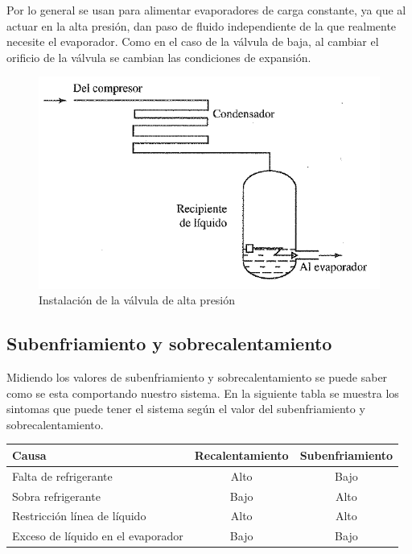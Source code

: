 Por lo general se usan para alimentar evaporadores de carga constante, ya que al actuar en la alta presi\'on, dan paso de fluido independiente de la que realmente necesite el evaporador. Como en el caso de la v\'alvula de baja, al cambiar el orificio de la v\'alvula se cambian las condiciones de expansi\'on.

\begin{figure}[H]
    \centering
    \includegraphics[width=.6\linewidth]{figuras/dispositivos-de-expansion/valvula-expansion-flotador-alta.png}
    \caption{Instalaci\'on de la v\'alvula de alta presi\'on}
    \label{valvula-flotador-alta-presion}
\end{figure}

\subsection{Subenfriamiento y sobrecalentamiento}

Midiendo los valores de subenfriamiento y sobrecalentamiento se puede saber como se esta comportando nuestro sistema. En la siguiente tabla se muestra los sintomas que puede tener el sistema seg\'un el valor del subenfriamiento y sobrecalentamiento.
\begin{table}[H]
    \centering
    \begin{tabular}{l c c} \hline
        Causa & Recalentamiento & Subenfriamiento\\ \hline
        Falta de refrigerante & Alto & Bajo\\
        Sobra refrigerante & Bajo & Alto\\
        Restricci\'on l\'inea de l\'iquido & Alto & Alto\\
        Exceso de l\'iquido en el evaporador & Bajo & Bajo\\ \hline
    \end{tabular}
\end{table}